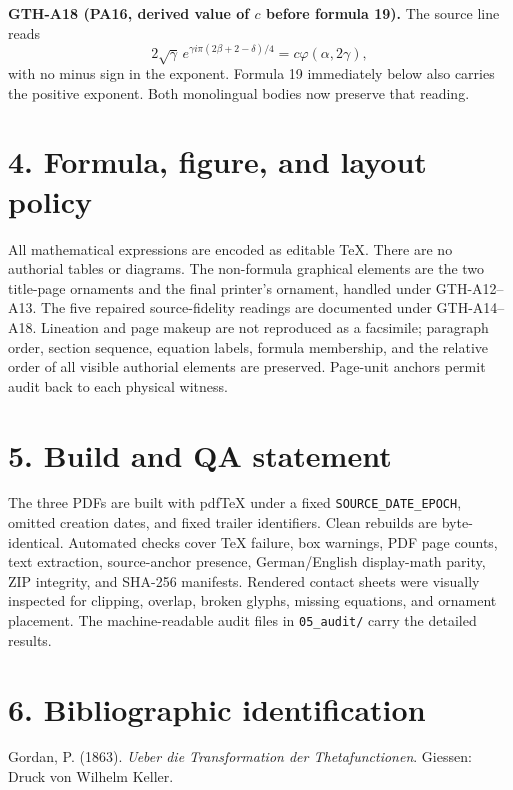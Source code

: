 \documentclass[10pt]{article}
\newcommand{\noteid}[1]{\textbf{#1}}
\begin{document}
\noteid{GTH-A18 (PA16, derived value of \(c\) before formula 19).} The source line reads
\[
2\sqrt{\gamma}\,e^{\gamma i\pi(2\beta+2-\delta)/4}=c\varphi(\alpha,2\gamma),
\]
with no minus sign in the exponent. Formula 19 immediately below also carries the positive exponent. Both monolingual bodies now preserve that reading.

\section*{4. Formula, figure, and layout policy}

All mathematical expressions are encoded as editable TeX. There are no authorial tables or diagrams. The non-formula graphical elements are the two title-page ornaments and the final printer's ornament, handled under GTH-A12--A13. The five repaired source-fidelity readings are documented under GTH-A14--A18. Lineation and page makeup are not reproduced as a facsimile; paragraph order, section sequence, equation labels, formula membership, and the relative order of all visible authorial elements are preserved. Page-unit anchors permit audit back to each physical witness.

\section*{5. Build and QA statement}

The three PDFs are built with pdfTeX under a fixed \texttt{SOURCE\_DATE\_EPOCH}, omitted creation dates, and fixed trailer identifiers. Clean rebuilds are byte-identical. Automated checks cover TeX failure, box warnings, PDF page counts, text extraction, source-anchor presence, German/English display-math parity, ZIP integrity, and SHA-256 manifests. Rendered contact sheets were visually inspected for clipping, overlap, broken glyphs, missing equations, and ornament placement. The machine-readable audit files in \texttt{05\_audit/} carry the detailed results.

\section*{6. Bibliographic identification}

Gordan, P. (1863). \textit{Ueber die Transformation der Thetafunctionen}. Giessen: Druck von Wilhelm Keller.
\end{document}

